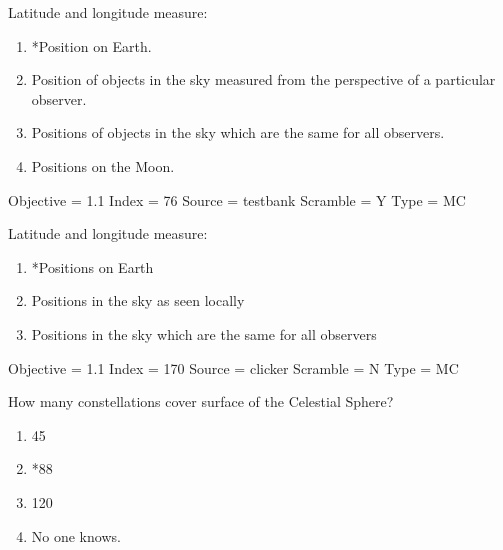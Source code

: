 \documentclass[11pt]{article}
\begin{document}
\begin{enumerate}
\setlength{\itemsep}{1pt} 
\setlength{\parskip}{0pt} 
\setlength{\parsep}{0pt}
\setlength{\multicolsep}{1pt} 

\begin{minipage}{\textwidth}
\begin{minipage}{\textwidth}
\item Latitude and longitude measure:
\begin{enumerate} 
\setlength{\itemsep}{1pt} 
\setlength{\parskip}{0pt} 
\setlength{\parsep}{0pt}
\setlength{\multicolsep}{1pt} 
\item *Position on Earth.
\item Position of objects in the sky measured from the perspective of a particular observer.
\item Positions of objects in the sky which are the same for all observers.
\item Positions on the Moon.
\end{enumerate} 
Objective = 1.1
Index = 76
Source = testbank
Scramble = Y
Type = MC
\end{minipage}
\end{minipage}
\vskip 0.20in

\begin{minipage}{\textwidth}
\begin{minipage}{\textwidth}
\item Latitude and longitude measure:
\begin{enumerate} 
\setlength{\itemsep}{1pt} 
\setlength{\parskip}{0pt} 
\setlength{\parsep}{0pt}
\setlength{\multicolsep}{1pt} 
\item *Positions on Earth
\item Positions in the sky as seen locally
\item Positions in the sky which are the same for all observers
\end{enumerate} 
Objective = 1.1
Index = 170
Source = clicker
Scramble = N
Type = MC
\end{minipage}
\end{minipage}
\vskip 0.20in

\begin{minipage}{\textwidth}
\begin{minipage}{\textwidth}
\item How many constellations cover surface of the Celestial Sphere?
\begin{multicols}{3}
\begin{enumerate} 
\setlength{\itemsep}{1pt} 
\setlength{\parskip}{0pt} 
\setlength{\parsep}{0pt}
\setlength{\multicolsep}{1pt} 
\item 45
\item *88
\item 120
\item No one knows.
\end{enumerate} 
\vfill 
\end{multicols}


\end{minipage}
\end{minipage}
\end{enumerate}
\end{document}
